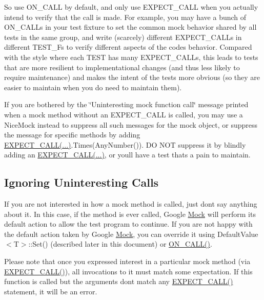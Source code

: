 So use {\ttfamily O\+N\+\_\+\+C\+A\+LL} by default, and only use {\ttfamily E\+X\+P\+E\+C\+T\+\_\+\+C\+A\+LL} when you actually intend to verify that the call is made. For example, you may have a bunch of {\ttfamily O\+N\+\_\+\+C\+A\+LL}s in your test fixture to set the common mock behavior shared by all tests in the same group, and write (scarcely) different {\ttfamily E\+X\+P\+E\+C\+T\+\_\+\+C\+A\+LL}s in different {\ttfamily T\+E\+S\+T\+\_\+F}s to verify different aspects of the code\textquotesingle{}s behavior. Compared with the style where each {\ttfamily T\+E\+ST} has many {\ttfamily E\+X\+P\+E\+C\+T\+\_\+\+C\+A\+LL}s, this leads to tests that are more resilient to implementational changes (and thus less likely to require maintenance) and makes the intent of the tests more obvious (so they are easier to maintain when you do need to maintain them).

If you are bothered by the \char`\"{}\+Uninteresting mock function call\char`\"{} message printed when a mock method without an {\ttfamily E\+X\+P\+E\+C\+T\+\_\+\+C\+A\+LL} is called, you may use a {\ttfamily Nice\+Mock} instead to suppress all such messages for the mock object, or suppress the message for specific methods by adding {\ttfamily \mbox{\hyperlink{gmock-spec-builders_8h_a535a6156de72c1a2e25a127e38ee5232}{E\+X\+P\+E\+C\+T\+\_\+\+C\+A\+L\+L(...)}}.Times(\+Any\+Number())}. DO N\+OT suppress it by blindly adding an {\ttfamily \mbox{\hyperlink{gmock-spec-builders_8h_a535a6156de72c1a2e25a127e38ee5232}{E\+X\+P\+E\+C\+T\+\_\+\+C\+A\+L\+L(...)}}}, or you\textquotesingle{}ll have a test that\textquotesingle{}s a pain to maintain.

\subsection*{Ignoring Uninteresting Calls}

If you are not interested in how a mock method is called, just don\textquotesingle{}t say anything about it. In this case, if the method is ever called, Google \mbox{\hyperlink{classMock}{Mock}} will perform its default action to allow the test program to continue. If you are not happy with the default action taken by Google \mbox{\hyperlink{classMock}{Mock}}, you can override it using {\ttfamily Default\+Value$<$T$>$\+::\+Set()} (described later in this document) or {\ttfamily \mbox{\hyperlink{gmock-spec-builders_8h_a5b12ae6cf84f0a544ca811b380c37334}{O\+N\+\_\+\+C\+A\+L\+L()}}}.

Please note that once you expressed interest in a particular mock method (via {\ttfamily \mbox{\hyperlink{gmock-spec-builders_8h_a535a6156de72c1a2e25a127e38ee5232}{E\+X\+P\+E\+C\+T\+\_\+\+C\+A\+L\+L()}}}), all invocations to it must match some expectation. If this function is called but the arguments don\textquotesingle{}t match any {\ttfamily \mbox{\hyperlink{gmock-spec-builders_8h_a535a6156de72c1a2e25a127e38ee5232}{E\+X\+P\+E\+C\+T\+\_\+\+C\+A\+L\+L()}}} statement, it will be an error.


